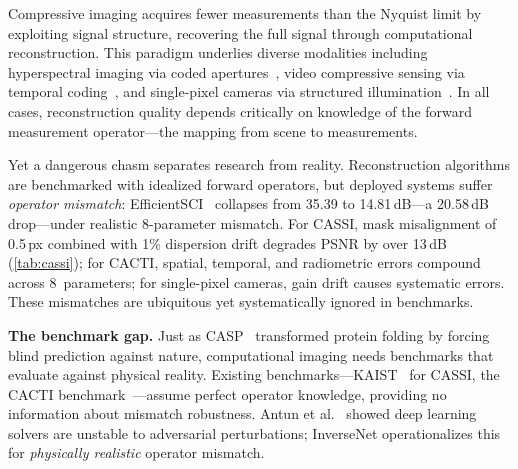 \documentclass[runningheads]{llncs}
\begin{document}
Compressive imaging acquires fewer measurements than the Nyquist limit by exploiting signal structure, recovering the full signal through computational reconstruction.
This paradigm underlies diverse modalities including hyperspectral imaging via coded apertures~\cite{wagadarikar2008cassi,meng2020e2e}, video compressive sensing via temporal coding~\cite{llull2013cacti,yuan2021snapshot}, and single-pixel cameras via structured illumination~\cite{duarte2008spc,edgar2019spc_review}.
In all cases, reconstruction quality depends critically on knowledge of the forward measurement operator---the mapping from scene to measurements.

Yet a dangerous chasm separates research from reality.
Reconstruction algorithms are benchmarked with idealized forward operators, but deployed systems suffer \emph{operator mismatch}: EfficientSCI~\cite{wang2023efficientsci} collapses from 35.39 to 14.81\,dB---a 20.58\,dB drop---under realistic 8-parameter mismatch.
For CASSI, mask misalignment of 0.5\,px combined with 1\% dispersion drift degrades PSNR by over 13\,dB (\cref{tab:cassi}); for CACTI, spatial, temporal, and radiometric errors compound across 8~parameters; for single-pixel cameras, gain drift causes systematic errors.
These mismatches are ubiquitous yet systematically ignored in benchmarks.

\textbf{The benchmark gap.}
Just as CASP~\cite{moult2005casp} transformed protein folding by forcing blind prediction against nature, computational imaging needs benchmarks that evaluate against physical reality.
Existing benchmarks---KAIST~\cite{choi2017kaist} for CASSI, the CACTI benchmark~\cite{yuan2021snapshot}---assume perfect operator knowledge, providing no information about mismatch robustness.
Antun et al.~\cite{antun2020instabilities} showed deep learning solvers are unstable to adversarial perturbations; InverseNet operationalizes this for \emph{physically realistic} operator mismatch.
\end{document}
